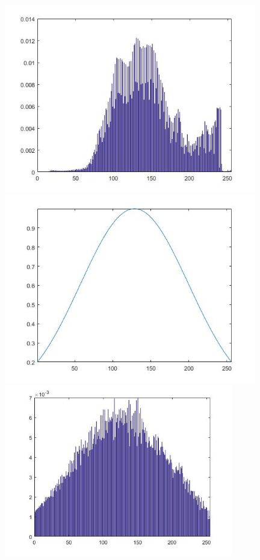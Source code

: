 \documentclass{article}
\begin{document}
\begin{figure}[!hbt]
\centering
\begin{minipage}{0.33\textwidth}
\centering
\includegraphics[width=0.98\textwidth]{images/hist_x.jpg}
\end{minipage}%
\begin{minipage}{0.33\textwidth}
\centering
\includegraphics[width=0.98\textwidth]{images/p1_hist_cible_malte.jpg}
\end{minipage}%
\begin{minipage}{0.33\textwidth}
\centering
\includegraphics[width=0.89\textwidth]{images/hist_xx.jpg}

\end{minipage}
\end{figure}
\end{document}
